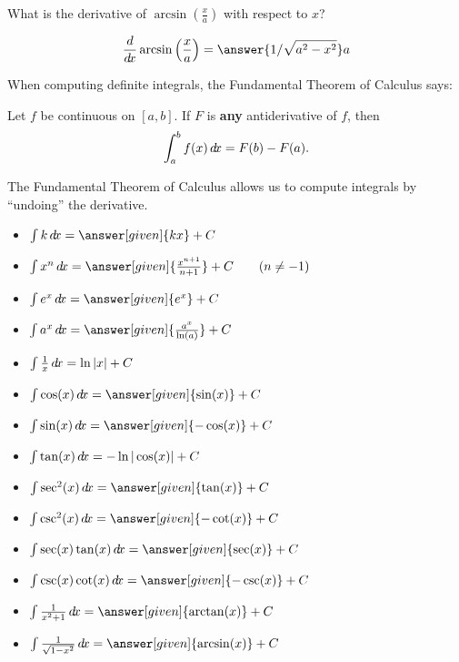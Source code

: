 \documentclass{ximera}
\begin{document}
\begin{question} 
  What is the derivative of $\arcsin\left(\frac{x}{a}\right)$ with respect to $x$?
  \begin{prompt} 
    \[
    \ddx \arcsin\left(\frac{x}{a}\right) = \answer{1/\sqrt{a^2 - x^2}}
a    \]
  \end{prompt}
\end{question}

When computing definite integrals, the Fundamental Theorem of Calculus
says:

\begin{theorem}
  Let $f$ be continuous on $[a,b]$. If $F$ is \textbf{any}
  antiderivative of $f$, then
  \[
  \int_a^b f(x)\mathop{}\!d\! x = F(b)-F(a).
  \]
\end{theorem}

The Fundamental Theorem of Calculus allows us to compute
integrals by ``undoing'' the derivative.

\begin{theorem}\hfil
\begin{itemize}
\item $\int k \d x= \answer[given]{k x}+C$
\item $\int x^n \d x= \answer[given]{\frac{x^{n+1}}{n+1}}+C\qquad(n\ne-1)$
\item $\int e^x \d x= \answer[given]{e^x} + C$
\item $\int a^x \d x= \answer[given]{\frac{a^x}{\ln(a)}}+C$
\item $\int \frac{1}{x} \mathop{}\!d\! x= \ln|x|+C$
\item $\int \cos(x) \d x = \answer[given]{\sin(x)} + C$
\item $\int \sin(x) \d x = \answer[given]{-\cos(x)} + C$  
\item $\int \tan(x) \mathop{}\!d\! x = -\ln|\cos(x)| + C$
\item $\int \sec^2(x) \d x = \answer[given]{\tan(x)} + C$
\item $\int \csc^2(x) \d x = \answer[given]{-\cot(x)} + C$
\item $\int \sec(x)\tan(x) \d x = \answer[given]{\sec(x)} + C$
\item $\int \csc(x)\cot(x) \d x = \answer[given]{-\csc(x)} + C$
\item $\int \frac{1}{x^2+1}\d x = \answer[given]{\arctan(x)} + C$
\item $\int \frac{1}{\sqrt{1-x^2}}\d x= \answer[given]{\arcsin(x)}+C$
\end{itemize}
\end{theorem}
\end{document}
